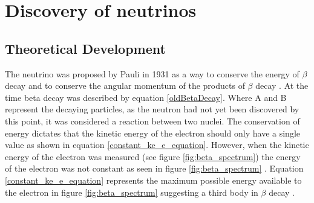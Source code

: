 \section{Discovery of neutrinos}
\subsection{Theoretical Development}
The neutrino was proposed by Pauli in 1931 as a way to conserve the energy of $\beta$ decay and to conserve the angular momentum of the products of $\beta$ decay  \cite{griffiths2008book}\cite{griffiths2008neutrino1.5}\cite{lederman1970resource}. At the time beta decay was described by equation \ref{oldBetaDecay}. Where A and B represent the decaying particles, as the neutron had not yet been discovered by this point, it was considered a reaction between two nuclei. The conservation of energy dictates that the kinetic energy of the electron should only have a single value as shown in equation \ref{constant_ke_e_equation}. However, when the kinetic energy of the electron was measured (see figure \ref{fig:beta_spectrum}) the energy of the electron was not constant as seen in figure \ref{fig:beta_spectrum} \cite{griffiths2008book} \cite{griffiths2008neutrino1.5} \cite{lewis1970neutrinos}. Equation \ref{constant_ke_e_equation} represents the maximum possible energy available to the electron in figure \ref{fig:beta_spectrum} suggesting a third body in $\beta$ decay \cite{griffiths2008book} \cite{griffiths2008neutrino1.5}.



